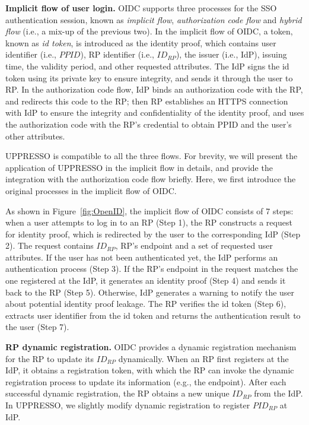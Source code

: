 \noindent\textbf{Implicit flow of user login.}
OIDC supports three processes for the SSO authentication session, known as {\em implicit flow}, {\em authorization code flow} and {\em hybrid flow} (i.e., a mix-up of the previous two).
In the implicit flow of OIDC, a token, known as {\em id token}, is introduced as the identity proof, which contains user identifier (i.e., $PPID$), RP identifier (i.e., $ID_{RP}$), the issuer (i.e., IdP), issuing time, the validity period, and other requested attributes. The IdP signs the id token using its private key to ensure integrity, and sends it through the user to RP.
In the authorization code flow, IdP binds an authorization code with the RP, and redirects this code to the RP;
 then RP establishes an HTTPS connection with IdP to ensure the integrity and confidentiality of the identity proof, and  uses the authorization code with the RP's credential to obtain PPID and the user's other  attributes.

UPPRESSO is compatible to all the three flows.
For brevity, we will present the application of UPPRESSO in the implicit flow in details, and provide the integration with the authorization code flow briefly.
Here, we first introduce the original processes in the implicit flow of OIDC.

As shown in Figure~\ref{fig:OpenID}, the implicit flow of OIDC consists of 7 steps: when a user attempts to log in to an RP (Step 1), the RP constructs a request for identity proof, which is redirected by the user to the corresponding IdP (Step 2). The request contains $ID_{RP}$, RP's endpoint and a set of requested user attributes. If the user has not been authenticated yet, the IdP performs an authentication process (Step 3). If the RP's endpoint in the request matches the one registered at the IdP, it generates an identity proof (Step 4) and sends it back to the RP (Step 5). Otherwise, IdP generates a warning to notify the user about potential identity proof leakage. The RP verifies the id token (Step 6), extracts user identifier from the id token and returns the authentication result to the user (Step 7).


\noindent\textbf{RP dynamic registration.} OIDC provides a dynamic registration mechanism~\cite{DynamicRegistration} for the RP to update its $ID_{RP}$ dynamically.
When an RP first registers at the IdP, it obtains a registration token, with which the  RP can invoke the dynamic registration process to
update its information (e.g., the endpoint).
After each successful dynamic registration, the RP obtains a new unique $ID_{RP}$ from the IdP.
In UPPRESSO, we slightly modify dynamic registration to register $PID_{RP}$ at IdP.


